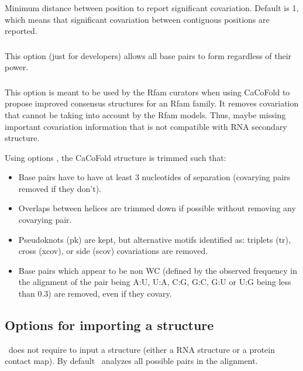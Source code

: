 \subsubsection{} Minimum distance between position to report significant covariation. Default is 1, which means that significant covariation between
contiguous positions are reported.

\subsubsection{} This option (just for developers) allows all base pairs to form regardless of their power.

\subsubsection{} This option is meant to be used by the Rfam curators when using CaCoFold to propose improved consensus structures for an Rfam family. It removes covariation that cannot be taking into account by the Rfam models. Thus, maybe missing important covariation information that is not compatible with RNA secondary structure.

\noindent
Using options , the CaCoFold structure is trimmed such that:
\begin{itemize}
\item Base pairs have to have at least 3 nucleotides of separation (covarying pairs removed if they don't).
\item Overlaps between helices are trimmed down if possible without removing any covarying pair.
\item Pseudoknots (pk) are kept, but alternative motifs identified as: triplets (tr), cross (xcov), or side (scov) covariations are removed.
\item Base pairs which appear to be non WC (defined by the observed frequency in the alignment of the pair being  A:U, U:A, C:G, G:C, G:U or U:G being less than 0.3) are removed, even if they covary.
\end{itemize}

\subsection{Options for importing a structure}

\rscape\ does not require to input a structure (either a RNA structure
or a protein contact map). By default \rscape\ analyzes all possible
pairs in the alignment.
\vspace{1mm}

